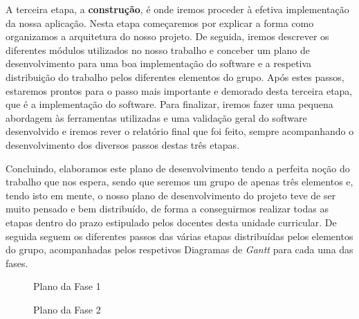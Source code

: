 \documentclass[a4paper,12pt]{scrreprt}
\newcommand{\tab}{
    \hspace{1cm}}
\begin{document}
        \tab A terceira etapa, a \textbf{construção}, é onde iremos proceder à efetiva implementação da nossa aplicação. Nesta etapa começaremos por explicar a forma como organizamos a arquitetura do nosso projeto. De seguida, iremos descrever os diferentes módulos utilizados no nosso trabalho e conceber um plano de desenvolvimento para uma boa implementação do software e a respetiva distribuição do trabalho pelos diferentes elementos do grupo. Após estes passos, estaremos prontos para o passo mais importante e demorado desta terceira etapa, que é a implementação do software. Para finalizar, iremos fazer uma pequena abordagem às ferramentas utilizadas e uma validação geral do software desenvolvido e iremos rever o relatório final que foi feito, sempre acompanhando o desenvolvimento dos diversos passos destas três etapas.
        
        \tab Concluindo, elaboramos este plano de desenvolvimento tendo a perfeita noção do trabalho que nos espera, sendo que seremos um grupo de apenas três elementos e, tendo isto em mente, o nosso plano de desenvolvimento do projeto teve de ser muito pensado e bem distribuído, de forma a conseguirmos realizar todas as etapas dentro do prazo estipulado pelos docentes desta unidade curricular. De seguida seguem os diferentes passos das várias etapas distribuídas pelos elementos do grupo, acompanhadas pelos respetivos Diagramas de \textit{Gantt} para cada uma das fases.
        
        \begin{figure}[hbt!]
            \centering
            \caption{Plano da Fase 1}
        \end{figure}
        
        \begin{figure}[hbt!]
            \centering
            \caption{Plano da Fase 2}
        \end{figure}
        
\end{document}
